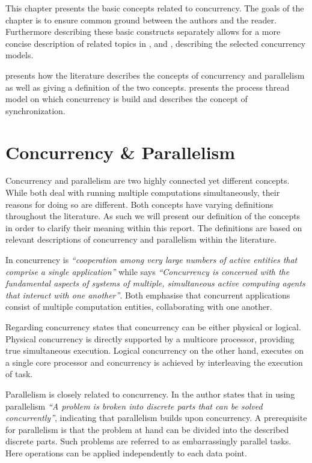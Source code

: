 \makeatletter {}\makeatother
{}
This chapter presents the basic concepts related to concurrency. The goals of the chapter is to ensure common ground between the authors and the reader. Furthermore describing these basic constructs separately allows for a more concise description of related topics in ,  and , describing the selected concurrency models. 

 presents how the literature describes the concepts of concurrency and parallelism as well as giving a definition of the two concepts.  presents the process thread model on which concurrency is build and  describes the concept of synchronization.
\section{Concurrency \& Parallelism}\label{sec:concurrency_parallelism}
Concurrency and parallelism are two highly connected yet different concepts. While both deal with running multiple computations simultaneously, their reasons for doing so are different. Both concepts have varying definitions throughout the literature. As such we will present our definition of the concepts in order to clarify their meaning within this report. The definitions are based on relevant descriptions of concurrency and parallelism within the literature.

In \cite[p. 330]{papadopoulos1998coordination} concurrency is \textit{``cooperation among very large numbers of active entities that comprise a single application''} while \cite[p. 607]{cleaveland1996strategic}
says \textit{``Concurrency is concerned with the fundamental aspects of systems of multiple, simultaneous active computing agents that interact with one another''}. Both emphasise that concurrent applications consist of multiple computation entities, collaborating with one another.

Regarding concurrency \cite[p. 579]{sebestaProLang} states that concurrency can be either physical or logical. Physical concurrency is directly supported by a multicore processor, providing true simultaneous execution. Logical concurrency on the other hand, executes on a single core processor and concurrency is achieved by interleaving the execution of task.

Parallelism is closely related to concurrency. In \cite{introPar} the author states that in using parallelism \textit{``A problem is broken into discrete parts that can be solved concurrently''}, indicating that parallelism builds upon concurrency. A prerequisite for parallelism is that the problem at hand can be divided into the described discrete parts. Such problems are referred to as embarrassingly parallel tasks\cite{sutter2005software}. Here operations can be applied independently to each data point.

